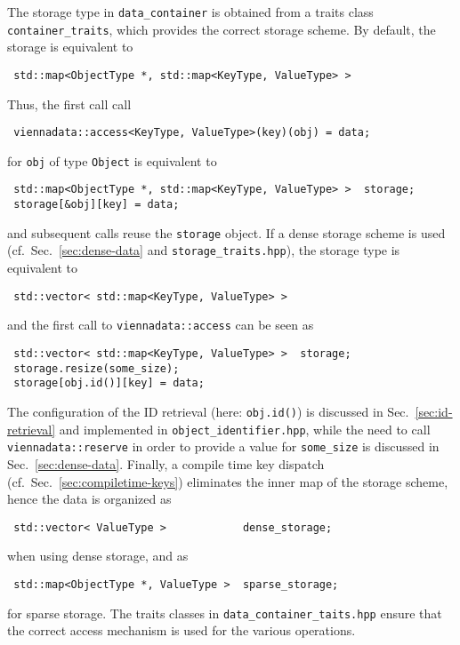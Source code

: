 The storage type in \lstinline|data_container| is obtained from a traits class \lstinline|container_traits|, which provides the correct storage scheme.
By default, the storage is equivalent to
\begin{lstlisting}
 std::map<ObjectType *, std::map<KeyType, ValueType> >
\end{lstlisting}
Thus, the first call call
\begin{lstlisting}
 viennadata::access<KeyType, ValueType>(key)(obj) = data;
\end{lstlisting}
for \lstinline|obj| of type \lstinline|Object| is equivalent to
\begin{lstlisting}
 std::map<ObjectType *, std::map<KeyType, ValueType> >  storage;
 storage[&obj][key] = data;
\end{lstlisting}
and subsequent calls reuse the \lstinline|storage| object. If a dense storage scheme is used (cf.~Sec.~\ref{sec:dense-data} and \lstinline|storage_traits.hpp|), the storage type is equivalent to
\begin{lstlisting}
 std::vector< std::map<KeyType, ValueType> >
\end{lstlisting}
and the first call to \lstinline|viennadata::access| can be seen as
\begin{lstlisting}
 std::vector< std::map<KeyType, ValueType> >  storage;
 storage.resize(some_size);
 storage[obj.id()][key] = data;
\end{lstlisting}
The configuration of the ID retrieval (here: \lstinline|obj.id()|) is discussed in Sec.~\ref{sec:id-retrieval} and implemented in \lstinline|object_identifier.hpp|, while the need to call \lstinline|viennadata::reserve| in order to provide a value for \lstinline|some_size| is discussed in Sec.~\ref{sec:dense-data}. Finally, a compile time key dispatch (cf.~Sec.~\ref{sec:compiletime-keys}) eliminates the inner map of the storage scheme, hence the data is organized as
\begin{lstlisting}
 std::vector< ValueType >            dense_storage;
\end{lstlisting}
when using dense storage, and as
\begin{lstlisting}
 std::map<ObjectType *, ValueType >  sparse_storage;
\end{lstlisting}
for sparse storage. The traits classes in \lstinline|data_container_taits.hpp| ensure that the correct access mechanism is used for the various operations.

